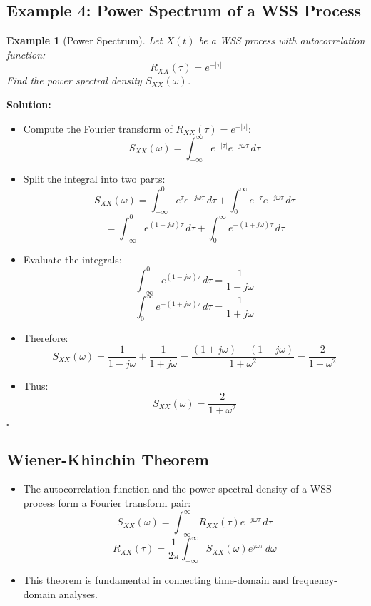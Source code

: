 \documentclass[12pt]{article}
\newtheorem{example}{Example}
\newenvironment{solution}{\noindent\textbf{Solution:}}{\hfill$\square$}
\begin{document}
\subsection{Example 4: Power Spectrum of a WSS Process}
\begin{example}[Power Spectrum]
Let \( X(t) \) be a WSS process with autocorrelation function:
\[
R_{XX}(\tau) = e^{-|\tau|}
\]
Find the power spectral density \( S_{XX}(\omega) \).
\end{example}
\begin{solution}
\begin{itemize}
    \item Compute the Fourier transform of \( R_{XX}(\tau) = e^{-|\tau|} \):
    \[
    S_{XX}(\omega) = \int_{-\infty}^{\infty} e^{-|\tau|} e^{-j\omega \tau} \, d\tau
    \]
    \item Split the integral into two parts:
    \[
    S_{XX}(\omega) = \int_{-\infty}^{0} e^{\tau} e^{-j\omega \tau} \, d\tau + \int_{0}^{\infty} e^{-\tau} e^{-j\omega \tau} \, d\tau
    \]
    \[
    = \int_{-\infty}^{0} e^{(1 - j\omega)\tau} \, d\tau + \int_{0}^{\infty} e^{-(1 + j\omega)\tau} \, d\tau
    \]
    \item Evaluate the integrals:
    \[
    \int_{-\infty}^{0} e^{(1 - j\omega)\tau} \, d\tau = \frac{1}{1 - j\omega}
    \]
    \[
    \int_{0}^{\infty} e^{-(1 + j\omega)\tau} \, d\tau = \frac{1}{1 + j\omega}
    \]
    \item Therefore:
    \[
    S_{XX}(\omega) = \frac{1}{1 - j\omega} + \frac{1}{1 + j\omega} = \frac{(1 + j\omega) + (1 - j\omega)}{1 + \omega^2} = \frac{2}{1 + \omega^2}
    \]
    \item Thus:
    \[
    S_{XX}(\omega) = \frac{2}{1 + \omega^2}
    \]
\end{itemize}
\end{solution}

\subsection{Wiener-Khinchin Theorem}
\begin{itemize}
    \item The autocorrelation function and the power spectral density of a WSS process form a Fourier transform pair:
    \[
    S_{XX}(\omega) = \int_{-\infty}^{\infty} R_{XX}(\tau) e^{-j\omega \tau} \, d\tau
    \]
    \[
    R_{XX}(\tau) = \frac{1}{2\pi} \int_{-\infty}^{\infty} S_{XX}(\omega) e^{j\omega \tau} \, d\omega
    \]
    \item This theorem is fundamental in connecting time-domain and frequency-domain analyses.
\end{itemize}
\end{document}
